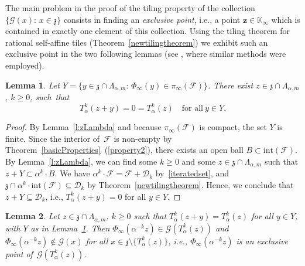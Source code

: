 \documentclass[12pt]{amsart}
\newtheorem{lemma}{Lemma}[section]
\theoremstyle{definition}
\theoremstyle{remark}
\numberwithin{equation}{section}
\begin{document}
The main problem in the proof of the tiling property of the collection $\{\mathcal{G}(x):\, x \in \mathfrak{z}\}$ consists in finding an \emph{exclusive point}, i.e., a point $\mathbf{z} \in \mathbb{K}_\infty$ which is contained in exactly one element of this collection.
Using the tiling theorem for rational self-affine tiles (Theorem~\ref{newtilingtheorem}) we exhibit such an exclusive point in the two following lemmas (see \cite[Section~4]{BSSST:11}, where similar methods were employed).

\begin{lemma} \label{l:Takz}
Let $Y = \{y \in \mathfrak{z} \cap \Lambda_{\alpha,m}:\, \Phi_\infty(y) \in \pi_\infty(\mathcal{F})\}$.
There exist $z \in \mathfrak{z} \cap \Lambda_{\alpha,m}$, $k \ge 0$, such~that
\[
T_\alpha^k(z + y) = 0 = T_\alpha^k(z) \quad\mbox{for all}\ y \in Y.
\]
\end{lemma}

\begin{proof}
By Lemma~\ref{l:zLambda} and because $\pi_\infty(\mathcal{F})$ is compact, the set $Y$ is finite.
Since the interior of~$\mathcal{F}$ is non-empty by Theorem~\ref{basicProperties}~(\ref{property2}), there exists an open ball $B \subset \mathrm{int}(\mathcal{F})$.
By Lemma~\ref{l:zLambda}, we can find some $k \ge 0$ and some $z \in \mathfrak{z} \cap \Lambda_{\alpha,m}$ such that $z + Y \subset \alpha^k \cdot B$.
We have $\alpha^k \cdot \mathcal{F} = \mathcal{F} + \mathcal{D}_k$ by~\eqref{iteratedset}, and $\mathfrak{z} \cap \alpha^k \cdot \mathrm{int}(\mathcal{F}) \subseteq \mathcal{D}_k$ by Theorem~\ref{newtilingtheorem}.
Hence, we conclude that $z + Y \subseteq \mathcal{D}_k$, i.e., $T_\alpha^k(z+y) = 0$ for all $y \in Y$.
\end{proof}

\begin{lemma} \label{l:exclusive}
Let $z \in \mathfrak{z} \cap \Lambda_{\alpha,m}$, $k \ge 0$ such that $T_\alpha^k(z + y) = T_\alpha^k(z)$ for all $y \in Y$, with $Y$ as in Lemma~\ref{l:Takz}.
Then $\Phi_\infty(\alpha^{-k} z) \in \mathcal{G}(T_\alpha^k(z))$ and $\Phi_\infty(\alpha^{-k} z) \not\in \mathcal{G}(x)$ for all $x \in \mathfrak{z} \setminus \{T_\alpha^k(z)\}$, i.e., $\Phi_\infty(\alpha^{-k} z)$ is an exclusive point of~$\mathcal{G}(T_\alpha^k(z))$.
\end{lemma}
\end{document}
